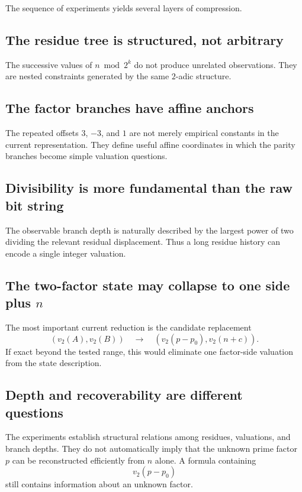 \documentclass[11pt,a4paper]{article}
\newcommand{\vTwo}{v_2}
\begin{document}
The sequence of experiments yields several layers of compression.

\subsection{The residue tree is structured, not arbitrary}

The successive values of $n\bmod 2^k$ do not produce unrelated observations. They are nested constraints generated by the same $2$-adic structure.

\subsection{The factor branches have affine anchors}

The repeated offsets $3$, $-3$, and $1$ are not merely empirical constants in the current representation. They define useful affine coordinates in which the parity branches become simple valuation questions.

\subsection{Divisibility is more fundamental than the raw bit string}

The observable branch depth is naturally described by the largest power of two dividing the relevant residual displacement. Thus a long residue history can encode a single integer valuation.

\subsection{The two-factor state may collapse to one side plus $n$}

The most important current reduction is the candidate replacement
\[
    (\vTwo(A),\vTwo(B))
    \quad\longrightarrow\quad
    \left(\vTwo(p-p_0),\vTwo(n+c)\right).
\]
If exact beyond the tested range, this would eliminate one factor-side valuation from the state description.

\subsection{Depth and recoverability are different questions}

The experiments establish structural relations among residues, valuations, and branch depths. They do not automatically imply that the unknown prime factor $p$ can be reconstructed efficiently from $n$ alone. A formula containing
\[
    \vTwo(p-p_0)
\]
still contains information about an unknown factor.
\end{document}
